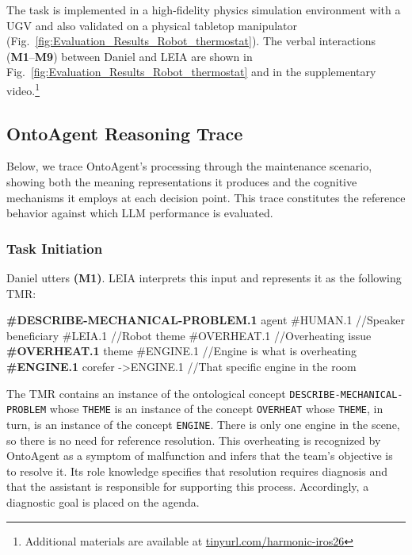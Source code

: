 \documentclass[letterpaper, 10 pt, conference]{ieeeconf}  %
\begin{document}
The task is implemented in a high-fidelity physics simulation environment with a UGV and also validated on a physical tabletop manipulator (Fig.~\ref{fig:Evaluation_Results_Robot_thermostat}). The verbal interactions (\textbf{M1}--\textbf{M9}) between Daniel and LEIA are shown in Fig.~\ref{fig:Evaluation_Results_Robot_thermostat} and in the supplementary video.\footnote{Additional materials are available at \href{https://tinyurl.com/harmonic-iros26}{tinyurl.com/harmonic-iros26}}






\subsection{OntoAgent Reasoning Trace}
\label{sec:ontoagent_trace}

Below, we trace OntoAgent's processing through the maintenance scenario, showing both the meaning representations it produces and the cognitive mechanisms it employs at each decision point. This trace constitutes the reference behavior against which LLM performance is evaluated.

\subsubsection{Task Initiation} Daniel utters \textbf{(M1)}. LEIA interprets this input and represents it as the following TMR:

\begin{codeblock}
\textbf{#DESCRIBE-MECHANICAL-PROBLEM.1}
 agent       #HUMAN.1    //Speaker
 beneficiary #LEIA.1     //Robot
 theme       #OVERHEAT.1 //Overheating issue
\textbf{#OVERHEAT.1}
 theme      #ENGINE.1  //Engine is what is overheating
\textbf{#ENGINE.1}
 corefer   ->ENGINE.1  //That specific engine in the room
\end{codeblock}

The TMR contains an instance of the ontological concept \texttt{DESCRIBE-MECHANICAL-PROBLEM} whose \texttt{THEME} is an instance of the concept \texttt{OVERHEAT} whose \texttt{THEME}, in turn, is an instance of the concept \texttt{ENGINE}. There is only one engine in the scene, so there is no need for reference resolution. This overheating is recognized by OntoAgent as a symptom of malfunction and infers that the team's objective is to resolve it. Its role knowledge specifies that resolution requires diagnosis and that the assistant is responsible for supporting this process. Accordingly, a diagnostic goal is placed on the agenda. 
\end{document}
